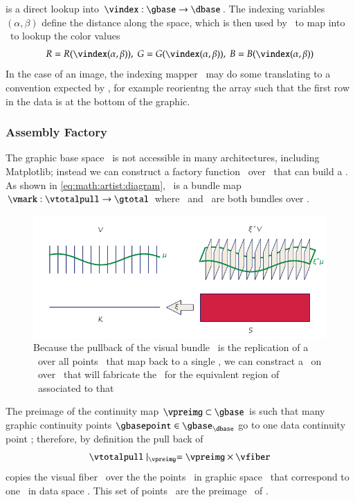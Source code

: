 \documentclass[journal]{vgtc}                %
\begin{document}
 is a direct lookup into  $\vindex:\gbase\rightarrow\dbase$. The indexing variables $(\alpha, \beta)$ define the distance along the space, which is then used by \vindex\ to map into \dbase\ to lookup the color values 
\begin{equation*}
R = R(\vindex(\alpha, \beta)), \; G = G(\vindex(\alpha, \beta)), \; B = B(\vindex(\alpha, \beta))
\end{equation*}
In the case of an image, the indexing mapper \vindex\ may do some translating to a convention expected by \vmark, for example reorientng the array such that the first row in the data is at the bottom of the graphic. 

\subsubsection{Assembly Factory}
\label{sec:math:artist:qhat}
The graphic base space \gbase\ is not accessible in many architectures, including Matplotlib; instead we can construct a factory function \vmarkd\ over \dbase\ that can build a \vmark. As shown in \autoref{eq:math:artist:diagram}, \vmark\ is a bundle map $\vmark: \vtotalpull\rightarrow \gtotal$ where \vtotalpull\ and \gtotal\ are both bundles over \gbase.
\begin{figure}[htb]
  \centering
    \includegraphics[width=1\columnwidth]{q_hat.png}
    \caption{Because the pullback of the visual bundle \vtotalpull\ is the replication of a \vsection\ over all points \gbasepoint\ that map back to a single \dbasepoint, we can constract a \vmarkd\ on \vsection\ over \dbasepoint\ that will fabricate the \vmark\ for the equivalent region of \gbasepoint\ associated to that \dbasepoint}
    \label{fig:math:artist:qhat}
\end{figure}

The preimage of the continuity map $\vpreimg \subset \gbase$ is such that many graphic continuity points $\gbasepoint \in \gbase_{\dbase}$ go to one data continuity point \dbasepoint; therefore, by definition the pull back of \vsection\
\begin{equation}
    \vtotalpull \mid_{\vpreimg} = \vpreimg \times \vfiber
\end{equation}
copies the visual fiber \vfiber\ over the the points \gbasepoint\ in graphic space \gbase\ that correspond to one \dbasepoint\ in data space \dbase. This set of points \gbasepoint\ are the preimage \vpreimg\ of \dbasepoint. 
\end{document}
